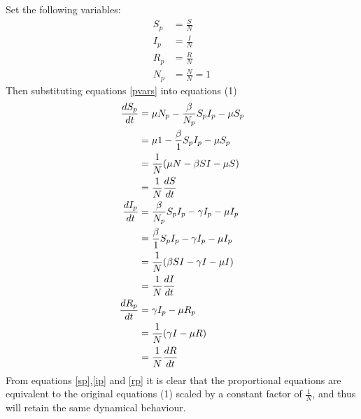 Set the following variables:
\begin{subequations}\label{pvars}
\begin{align}
    S_p &= \frac{S}{N}\\
    I_p &= \frac{I}{N}\\
    R_p &= \frac{R}{N}\\
    N_p &= \frac{N}{N} = 1
\end{align}
\end{subequations}
Then substituting equations \ref{pvars} into equations (1)
\begin{align}
  \frac{dS_p}{dt} &= \mu N_p -\frac{\beta}{N_p} S_p I_p - \mu S_p\nonumber\\
                  &= \mu 1 -\frac{\beta}{1} S_p I_p - \mu S_p\nonumber\\
                  &= \frac{1}{N}(\mu N -\beta SI - \mu S)\nonumber\\
                  &= \frac{1}{N} \frac{dS}{dt}\label{sp}\\
  \vspace{8pt}
  \frac{dI_p}{dt} &= \frac{\beta}{N_p} S_p I_p - \gamma I_p - \mu I_p\nonumber\\
                  &= \frac{\beta}{1} S_p I_p - \gamma I_p - \mu I_p\nonumber\\
                  &= \frac{1}{N} (\beta SI - \gamma I - \mu I)\nonumber\\
                  &= \frac{1}{N} \frac{dI}{dt}\label{ip}\\
  \vspace{8pt}
  \frac{dR_p}{dt} &= \gamma I_p - \mu R_p\nonumber\\
                  &= \frac{1}{N} (\gamma I - \mu R)\nonumber\\
                  &= \frac{1}{N} \frac{dR}{dt}\label{rp}
\end{align}
From equations \ref{sp},\ref{ip} and \ref{rp} it is clear that the proportional equations are equivalent to the original equations (1) scaled by a constant factor of $\frac{1}{N}$, and thus will retain the same dynamical behaviour.
